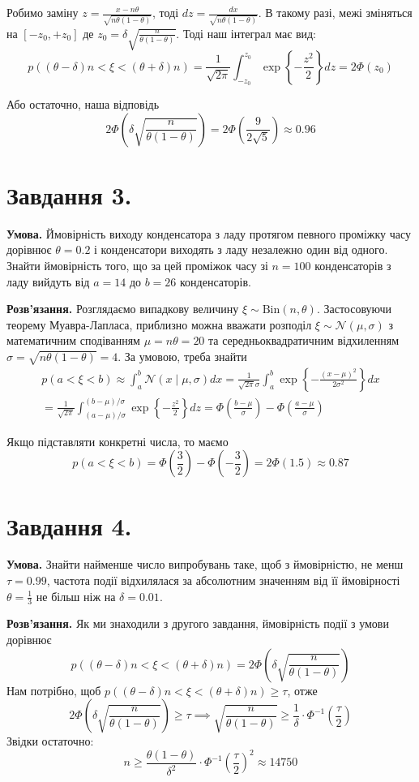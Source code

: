 \documentclass[14pt]{extarticle}
\begin{document}
Робимо заміну $z = \frac{x-n\theta}{\sqrt{n\theta(1-\theta)}}$, тоді $dz = \frac{dx}{\sqrt{n\theta(1-\theta)}}$. В такому разі, межі зміняться на $[-z_0,+z_0]$ де $z_0 = \delta\sqrt{\frac{n}{\theta(1-\theta)}}$. Тоді наш інтеграл має вид:
\[
p((\theta-\delta)n < \xi < (\theta+\delta)n) = \frac{1}{\sqrt{2\pi}}\int_{-z_0}^{z_0} \exp\left\{-\frac{z^2}{2}\right\}dz = 2\Phi(z_0) 
\]

Або остаточно, наша відповідь
\[
2\Phi\left(\delta\sqrt{\frac{ n}{\theta(1-\theta)}}\right) = 2\Phi\left(\frac{9}{2\sqrt{5}}\right) \approx 0.96
\]

\pagebreak
\section*{Завдання 3.}

\textbf{Умова.} Ймовірність виходу конденсатора з ладу протягом певного проміжку часу дорівнює $\theta=0.2$ і конденсатори виходять з ладу незалежно один від одного. Знайти ймовірність того, що за цей проміжок часу зі $n=100$ конденсаторів з ладу вийдуть від $a=14$ до $b=26$ конденсаторів.

\textbf{Розв'язання.} Розглядаємо випадкову величину $\xi \sim \text{Bin}(n,\theta)$. Застосовуючи теорему Муавра-Лапласа, приблизно можна вважати розподіл $\xi \sim \mathcal{N}(\mu,\sigma)$ з математичним сподіванням $\mu=n\theta = 20$ та середньоквадратичним відхиленням $\sigma=\sqrt{n\theta(1-\theta)}=4$. За умовою, треба знайти
\begin{gather*}
p(a < \xi < b) \approx \int_{a}^b \mathcal{N}(x \mid \mu,\sigma)dx = \frac{1}{\sqrt{2\pi}\sigma}\int_a^b \exp\left\{-\frac{(x-\mu)^2}{2\sigma^2}\right\}dx \\
= \frac{1}{\sqrt{2\pi}}\int_{(a-\mu)/\sigma}^{(b-\mu)/\sigma} \exp\left\{-\frac{z^2}{2}\right\}dz = \Phi\left(\frac{b-\mu}{\sigma}\right) - \Phi\left(\frac{a-\mu}{\sigma}\right)
\end{gather*}

Якщо підставляти конкретні числа, то маємо
\[
p(a < \xi < b) = \Phi\left(\frac{3}{2}\right) - \Phi\left(-\frac{3}{2}\right) = 2 \Phi(1.5) \approx 0.87
\]

\pagebreak
\section*{Завдання 4.}

\textbf{Умова.} Знайти найменше число випробувань таке, щоб з ймовірністю, не менш $\tau=0.99$, частота події відхилялася за абсолютним значенням від її ймовірності $\theta = \frac{1}{3}$ не більш ніж на $\delta=0.01$.

\textbf{Розв'язання.} Як ми знаходили з другого завдання, ймовірність події з умови дорівнює
\[
p((\theta-\delta)n < \xi < (\theta+\delta)n) = 2\Phi\left(\delta\sqrt{\frac{n}{\theta(1-\theta)}}\right)
\]
Нам потрібно, щоб $p((\theta-\delta)n < \xi < (\theta+\delta)n) \geq \tau$, отже
\[
2\Phi\left(\delta\sqrt{\frac{n}{\theta(1-\theta)}}\right) \geq \tau \implies \sqrt{\frac{n}{\theta(1-\theta)}} \geq \frac{1}{\delta} \cdot \Phi^{-1} \left(\frac{\tau}{2}\right)
\]
Звідки остаточно:
\[
n \geq \frac{\theta(1-\theta)}{\delta^2} \cdot \Phi^{-1}\left(\frac{\tau}{2}\right)^2 \approx 14750
\]
\end{document}
